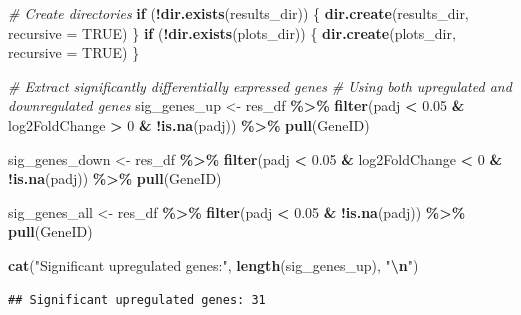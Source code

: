 \documentclass[
]{article}
\newenvironment{Shaded}{\begin{snugshade}}{\end{snugshade}}
\newcommand{\AttributeTok}[1]{\textcolor[rgb]{0.13,0.29,0.53}{#1}}
\newcommand{\CommentTok}[1]{\textcolor[rgb]{0.56,0.35,0.01}{\textit{#1}}}
\newcommand{\ConstantTok}[1]{\textcolor[rgb]{0.56,0.35,0.01}{#1}}
\newcommand{\ControlFlowTok}[1]{\textcolor[rgb]{0.13,0.29,0.53}{\textbf{#1}}}
\newcommand{\DecValTok}[1]{\textcolor[rgb]{0.00,0.00,0.81}{#1}}
\newcommand{\FloatTok}[1]{\textcolor[rgb]{0.00,0.00,0.81}{#1}}
\newcommand{\FunctionTok}[1]{\textcolor[rgb]{0.13,0.29,0.53}{\textbf{#1}}}
\newcommand{\NormalTok}[1]{#1}
\newcommand{\OtherTok}[1]{\textcolor[rgb]{0.56,0.35,0.01}{#1}}
\newcommand{\SpecialCharTok}[1]{\textcolor[rgb]{0.81,0.36,0.00}{\textbf{#1}}}
\newcommand{\StringTok}[1]{\textcolor[rgb]{0.31,0.60,0.02}{#1}}
\begin{document}
\begin{Shaded}
\begin{Highlighting}[]
\CommentTok{\# Create directories}
\ControlFlowTok{if}\NormalTok{ (}\SpecialCharTok{!}\FunctionTok{dir.exists}\NormalTok{(results\_dir)) \{}
  \FunctionTok{dir.create}\NormalTok{(results\_dir, }\AttributeTok{recursive =} \ConstantTok{TRUE}\NormalTok{)}
\NormalTok{\}}
\ControlFlowTok{if}\NormalTok{ (}\SpecialCharTok{!}\FunctionTok{dir.exists}\NormalTok{(plots\_dir)) \{}
  \FunctionTok{dir.create}\NormalTok{(plots\_dir, }\AttributeTok{recursive =} \ConstantTok{TRUE}\NormalTok{)}
\NormalTok{\}}

\CommentTok{\# Extract significantly differentially expressed genes}
\CommentTok{\# Using both upregulated and downregulated genes}
\NormalTok{sig\_genes\_up }\OtherTok{\textless{}{-}}\NormalTok{ res\_df }\SpecialCharTok{\%\textgreater{}\%}
  \FunctionTok{filter}\NormalTok{(padj }\SpecialCharTok{\textless{}} \FloatTok{0.05} \SpecialCharTok{\&}\NormalTok{ log2FoldChange }\SpecialCharTok{\textgreater{}} \DecValTok{0} \SpecialCharTok{\&} \SpecialCharTok{!}\FunctionTok{is.na}\NormalTok{(padj)) }\SpecialCharTok{\%\textgreater{}\%}
  \FunctionTok{pull}\NormalTok{(GeneID)}

\NormalTok{sig\_genes\_down }\OtherTok{\textless{}{-}}\NormalTok{ res\_df }\SpecialCharTok{\%\textgreater{}\%}
  \FunctionTok{filter}\NormalTok{(padj }\SpecialCharTok{\textless{}} \FloatTok{0.05} \SpecialCharTok{\&}\NormalTok{ log2FoldChange }\SpecialCharTok{\textless{}} \DecValTok{0} \SpecialCharTok{\&} \SpecialCharTok{!}\FunctionTok{is.na}\NormalTok{(padj)) }\SpecialCharTok{\%\textgreater{}\%}
  \FunctionTok{pull}\NormalTok{(GeneID)}

\NormalTok{sig\_genes\_all }\OtherTok{\textless{}{-}}\NormalTok{ res\_df }\SpecialCharTok{\%\textgreater{}\%}
  \FunctionTok{filter}\NormalTok{(padj }\SpecialCharTok{\textless{}} \FloatTok{0.05} \SpecialCharTok{\&} \SpecialCharTok{!}\FunctionTok{is.na}\NormalTok{(padj)) }\SpecialCharTok{\%\textgreater{}\%}
  \FunctionTok{pull}\NormalTok{(GeneID)}

\FunctionTok{cat}\NormalTok{(}\StringTok{"Significant upregulated genes:"}\NormalTok{, }\FunctionTok{length}\NormalTok{(sig\_genes\_up), }\StringTok{"}\SpecialCharTok{\textbackslash{}n}\StringTok{"}\NormalTok{)}
\end{Highlighting}
\end{Shaded}

\begin{verbatim}
## Significant upregulated genes: 31
\end{verbatim}
\end{document}

